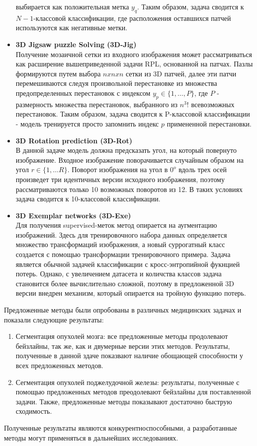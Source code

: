 \begin{itemize}
    выбирается как положительная метка \(y_q\). Таким образом, задача сводится к \(N-1\)-классовой 
    классификации, где расположения оставшихся патчей используются как негативные метки.
    \item \textbf{3D Jigsaw puzzle Solving (3D-Jig)} \\
    Получение мозаичной сетки из входного изображения может рассматриваться как 
    расширение вышеприведенной задачи RPL, основанной на патчах. Пазлы формируются
    путем выбора \(nxnxn\) сетки из 3D патчей, далее эти патчи перемешиваются следуя 
    произвольной перестановке из множества предопределенных перестановок с индексом 
    \(y_{p}\in \{1,\dots , P\}\), где \(P\) - размерность множества перестановок, выбранного
    из \(n^{3}!\) всевозможных перестановок. Таким образом, задача сводится к P-классовой 
    классификации - модель тренируется просто запомнить индекс \(p\) примененной перестановки.

    \item \textbf{3D Rotation prediction (3D-Rot)} \\
    В данной задаче модель должна предсказать угол, на который повернуто изображение.
    Входное изображение поворачивается случайным образом на угол \(r\in \{1, \dots R\}\).
    Поворот изображения на угол в \(0^{o}\) вдоль трех осей произведет три идентичных версии
    исходного изображения, поэтому рассматриваются только 10 возможных поворотов из 12. 
    В таких условиях задача сводится к 10-классовой классификации.

    \item \textbf{3D Exemplar networks (3D-Exe)} \\
    Для получения supervised-меток метод опирается на аугментацию изображений. 
    Здесь для тренировочного набора данных определяется множество трансформаций 
    изображения, а новый суррогатный класс создается с помощью трансформации тренировочного 
    примера. Задача является обычной задачей классификации с кросс-энтропийной фукнцией потерь.
    Однако, с увеличением датасета и количства классов задача становится более вычислительно сложной, 
    поэтому в предложенной 3D версии внедрен механизм, который опирается на тройную
    функцию потерь.
\end{itemize}

Предложенные методы были опробованы в различных медицинских задачах и показали следующие результаты: 
\begin{enumerate}
    \item Сегментация опухолей мозга: все предложенные методы продолевают бейзлайны, так же, как и двумерные версии этих методов.
    Результаты, полученные в данной здаче показвают наличие обощающей способности
    у всех предложенных методов.
    \item Сегментация опухолей поджелудочной железы: результаты, полученные с помощью предложенных методов преодолевают бейзлайны для поставленной 
    задачи. Также, предложенные методы показывают достаточно быструю сходимость.
\end{enumerate}

Полученные результаты являются конкурентноспособными, а разработанные 
методы могут применяться в дальнейших исследованиях.